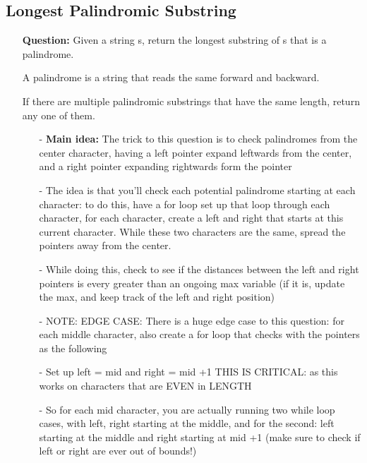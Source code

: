 \documentclass[12pt]{article}
\begin{document}
\subsection{Longest Palindromic Substring}
\begin{enumerate}
  \item[] \textbf{Question:} Given a string s, return the longest substring of s that is a palindrome.

A palindrome is a string that reads the same forward and backward.

If there are multiple palindromic substrings that have the same length, return any one of them.


    \begin{enumerate}
      \item[-] \textbf{Main idea:} The trick to this question is to check palindromes from the center character, having a left pointer expand leftwards from the center, and a right pointer expanding rightwards form the pointer
      \item[-] The idea is that you'll check each potential palindrome starting at each character: to do this, have a for loop set up that loop through each character, for each character, create a left and right that starts at this current character. While these two characters are the same, spread the pointers away from the center.
      \item[-] While doing this, check to see if the distances between the left and right pointers is every greater than an ongoing max variable (if it is, update the max, and keep track of the left and right position)
      \item[-] NOTE: EDGE CASE: There is a huge edge case to this question: for each middle character, also create a for loop that checks with the pointers as the following

      \item[-] Set up left = mid and right  = mid +1 THIS IS CRITICAL: as this works on characters that are EVEN in LENGTH 
      \item[-] So for each mid character, you are actually running two while loop cases, with left, right starting at the middle, and for the second: left starting at the middle and right starting at mid +1 (make sure to check if left or right are ever out of bounds!)
    \end{enumerate}
\end{enumerate}
\end{document}
